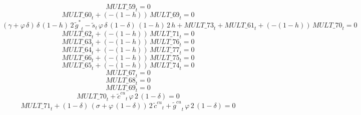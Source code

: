 \begin{dmath}
{MULT\_59}_{t}=0
\end{dmath}
\begin{dmath}
{MULT\_60}_{t}+\left(-\left(1-{{h}}\right)\right)\, {MULT\_69}_{t}=0
\end{dmath}
\begin{dmath}
\left({{\gamma}}+{{\varphi}}\, {{\delta}}\right)\, {{\delta}}\, \left(1-{{h}}\right)\, 2\, {{\tilde g^*}}_{t}-{{\tilde s}}_{t}\, {{\varphi}}\, {{\delta}}\, \left(1-{{\delta}}\right)\, \left(1-{{h}}\right)\, 2\, {{h}}+{MULT\_73}_{t}+{MULT\_61}_{t}+\left(-\left(1-{{h}}\right)\right)\, {MULT\_70}_{t}=0
\end{dmath}
\begin{dmath}
{MULT\_62}_{t}+\left(-\left(1-{{h}}\right)\right)\, {MULT\_71}_{t}=0
\end{dmath}
\begin{dmath}
{MULT\_63}_{t}+\left(-\left(1-{{h}}\right)\right)\, {MULT\_76}_{t}=0
\end{dmath}
\begin{dmath}
{MULT\_64}_{t}+\left(-\left(1-{{h}}\right)\right)\, {MULT\_77}_{t}=0
\end{dmath}
\begin{dmath}
{MULT\_66}_{t}+\left(-\left(1-{{h}}\right)\right)\, {MULT\_75}_{t}=0
\end{dmath}
\begin{dmath}
{MULT\_65}_{t}+\left(-\left(1-{{h}}\right)\right)\, {MULT\_74}_{t}=0
\end{dmath}
\begin{dmath}
{MULT\_67}_{t}=0
\end{dmath}
\begin{dmath}
{MULT\_68}_{t}=0
\end{dmath}
\begin{dmath}
{MULT\_69}_{t}=0
\end{dmath}
\begin{dmath}
{MULT\_70}_{t}+{{\tilde c^{cu}}}_{t}\, {{\varphi}}\, 2\, \left(1-{{\delta}}\right)=0
\end{dmath}
\begin{dmath}
{MULT\_71}_{t}+\left(1-{{\delta}}\right)\, \left({{\sigma}}+{{\varphi}}\, \left(1-{{\delta}}\right)\right)\, 2\, {{\tilde c^{cu}}}_{t}+{{\tilde g^{cu}}}_{t}\, {{\varphi}}\, 2\, \left(1-{{\delta}}\right)=0
\end{dmath}
